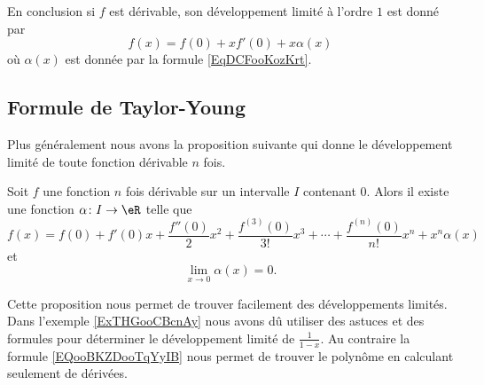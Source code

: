 En conclusion si \( f\) est dérivable, son développement limité à l'ordre \(  1\) est donné par
\begin{equation}
    f(x)=f(0)+xf'(0)+x\alpha(x)
\end{equation}
où \( \alpha(x)\) est donnée par la formule \eqref{EqDCFooKozKrt}.

\subsection{Formule de Taylor-Young}

Plus généralement nous avons la proposition suivante qui donne le développement limité de toute fonction dérivable \( n\) fois.

\begin{proposition}    \label{PropVDGooCexFwy}
    Soit \( f\) une fonction \( n\) fois dérivable sur un intervalle \( I\) contenant \( 0\). Alors il existe une fonction \( \alpha\colon I\to \eR\) telle que
    \begin{equation}        \label{EQooBKZDooTqYyIB}
        f(x)=f(0)+f'(0)x+\frac{ f''(0) }{ 2 }x^2+\frac{ f^{(3)}(0) }{ 3! }x^3+\cdots +\frac{ f^{(n)}(0) }{ n! }x^n+x^n\alpha(x)
    \end{equation}
    et
    \begin{equation}
        \lim_{x\to 0} \alpha(x)=0.
    \end{equation}
\end{proposition}

Cette proposition nous permet de trouver facilement des développements limités. Dans l'exemple \ref{ExTHGooCBcnAy} nous avons dû utiliser des astuces et des formules pour déterminer le développement limité de \( \frac{1}{ 1-x }\). Au contraire la formule \eqref{EQooBKZDooTqYyIB} nous permet de trouver le polynôme en calculant seulement de dérivées.

